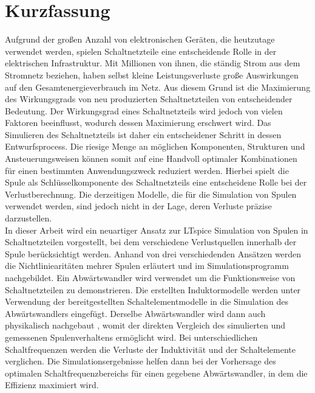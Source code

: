 
\chapter*{Kurzfassung}   \label{cha:Kurzfassung}
Aufgrund der großen Anzahl von elektronischen Geräten, die heutzutage verwendet werden, spielen Schaltnetzteile eine entscheidende Rolle in der elektrischen Infrastruktur. Mit Millionen von ihnen, die ständig Strom aus dem Stromnetz beziehen, haben selbst kleine Leistungsverluste große Auswirkungen auf den Gesamtenergieverbrauch im Netz. Aus diesem Grund ist die Maximierung des Wirkungsgrads von neu produzierten Schaltnetzteilen von entscheidender Bedeutung. Der Wirkungsgrad eines Schaltnetzteils wird jedoch von vielen Faktoren beeinflusst, wodurch dessen Maximierung erschwert wird. Das Simulieren des Schaltnetzteils ist daher ein entscheidener Schritt in dessen Entwurfsprocess. Die riesige Menge an möglichen Komponenten, Strukturen und Ansteuerungsweisen können somit auf eine Handvoll optimaler Kombinationen für einen bestimmten Anwendungszweck reduziert werden. Hierbei spielt die Spule als Schlüsselkomponente des Schaltnetzteils eine entscheidene Rolle bei der Verlustberechnung. Die derzeitigen Modelle, die für die Simulation von Spulen verwendet werden, sind jedoch nicht in der Lage, deren Verluste präzise darzustellen.\\
In dieser Arbeit wird ein neuartiger Ansatz zur LTspice Simulation von Spulen in Schaltnetzteilen vorgestellt, bei dem verschiedene Verlustquellen innerhalb der Spule berücksichtigt werden. Anhand von drei verschiedenden Ansätzen werden die Nichtliniearitäten mehrer Spulen erläutert und im Simulationsprogramm nachgebildet. Ein Abwärtswandler wird verwendet um die Funktionsweise von Schaltnetzteilen zu demonstrieren. Die erstellten Induktormodelle werden unter Verwendung der bereitgestellten Schaltelementmodelle in die Simulation des Abwärtswandlers eingefügt. Derselbe Abwärtswandler wird dann auch physikalisch nachgebaut , womit der direkten Vergleich des simulierten und gemessenen Spulenverhaltens ermöglicht wird. Bei unterschiedlichen Schaltfrequenzen werden die Verluste der Induktivität und der Schaltelemente verglichen. Die Simulationsergebnisse helfen dann bei der Vorhersage des optimalen Schaltfrequenzbereichs für einen gegebene Abwärtswandler, in dem die Effizienz maximiert wird.